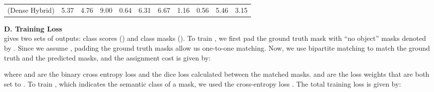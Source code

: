 \documentclass[10pt,twocolumn,letterpaper]{article}
\newcommand{\myparagraph}[1]{\vspace{3pt}\noindent\textbf{#1}}
\newcommand\our{\text{Mask2Anomaly}}
\begin{document}
\begin{table*}[ht]
{\begin{tabular}{c|cc|cc|cc|cc|cc}
(Dense Hybrid) &5.37 &4.76 &9.00 &0.64 &6.31 &6.67 &1.16 &0.56 &5.46	&3.15
\end{tabular}}
\caption{\textbf{Performance stability in Mask2Former:} we can observe that the average deviation in the performance of the dense hybrid is significantly higher than Mask2Anomaly.  denotes the standard deviation. } \vspace{-1em}
\label{sup-tab:ood-sets} 
\end{table*} \begin{table*}[t]
\centering
\renewcommand{\arraystretch}{1}
\caption{Class-wise semantic segmentation results comparison between Mask2Former and Mask2Anomaly on Cityscapes validation set.} \vspace{-1em}
\label{sstab:main} 
\end{table*}
 \myparagraph{D. Training Loss}\\
\our{} gives two sets of outputs: class scores () and class masks (). To train , we first pad the ground truth mask  with “no object” masks denoted by . Since we assume , padding the ground truth masks allow us one-to-one matching. Now, we use bipartite matching to match the ground truth and the predicted masks, and the assignment cost is given by:

where  and  are the binary cross entropy loss and the dice loss calculated between the matched masks.  and  are the loss weights that are both set to . 
To train , which indicates the semantic class of a mask, we used the cross-entropy loss . The total training loss is given by:
\end{document}
